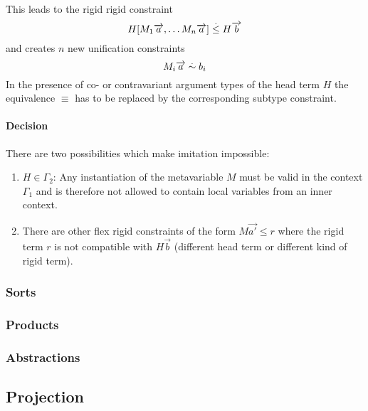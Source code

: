 This leads to the rigid rigid constraint
$$
    H [M_1 {\overrightarrow {a}}, \ldots M_n {\overrightarrow {a}}] \stackrel . \le H {\overrightarrow {b}}
$$
and creates $n$ new unification constraints
$$
    M_ i {\overrightarrow {a}} \stackrel . \sim b_i
$$
In the presence of co- or contravariant argument types of the head term $H$ the
equivalence $\equiv$ has to be replaced by the corresponding subtype constraint.

\paragraph{Decision} There are two possibilities which make imitation impossible:
\begin{enumerate}
    \item $H \in \Gamma_2$: Any instantiation of the metavariable $M$ must be
        valid in the context $\Gamma_1$ and is therefore not allowed to contain
        local variables from an inner context.

    \item There are other flex rigid constraints of the form $M \vec {a'} \le r$
        where the rigid term $r$ is not compatible with $H \vec b$ (different
        head term or different kind of rigid term).
\end{enumerate}





\subsubsection {Sorts}





\subsubsection {Products}





\subsubsection {Abstractions}





\subsection{Projection}


